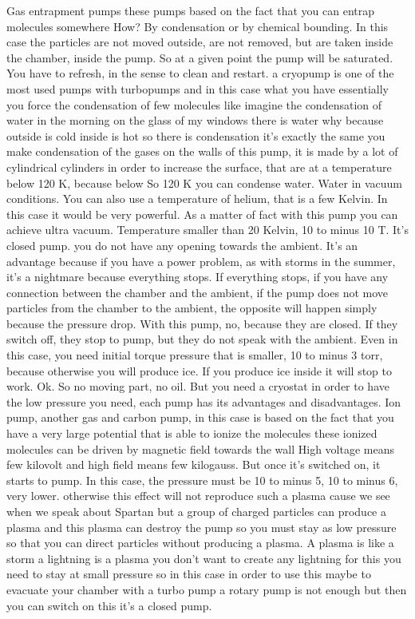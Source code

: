 Gas entrapment pumps these pumps based on the fact that you can entrap molecules somewhere How? By condensation or by chemical bounding. In this case the particles are not moved outside, are not removed, but are taken inside the chamber, inside the pump. So at a given point the pump will be saturated. You have to refresh, in the sense to clean and restart. a cryopump is one of the most used pumps with turbopumps and in this case what you have essentially you force the condensation of few molecules like imagine the condensation of water in the morning on the glass of my windows there is water why because outside is cold inside is hot so there is condensation it's exactly the same you make condensation of the gases on the walls of this pump, it is made by a lot of cylindrical cylinders in order to increase the surface, that are at a temperature below 120 K, because below So 120 K you can condense water. Water in vacuum conditions. You can also use a temperature of helium, that is a few Kelvin. In this case it would be very powerful. As a matter of fact with this pump you can achieve ultra vacuum. Temperature smaller than 20 Kelvin, 10 to minus 10 T. It's closed pump. you do not have any opening towards the ambient. It's an advantage because if you have a power problem, as with storms in the summer, it's a nightmare because everything stops. If everything stops, if you have any connection between the chamber and the ambient, if the pump does not move particles from the chamber to the ambient, the opposite will happen simply because the pressure drop. With this pump, no, because they are closed. If they switch off, they stop to pump, but they do not speak with the ambient. Even in this case, you need initial torque pressure that is smaller, 10 to minus 3 torr, because otherwise you will produce ice. If you produce ice inside it will stop to work. Ok. So no moving part, no oil. But you need a cryostat in order to have the low pressure you need, each pump has its advantages and disadvantages.
Ion pump, another gas and carbon pump, in this case is based on the fact that you have a very large potential that is able to ionize the molecules these ionized molecules can be driven by magnetic field towards the wall High voltage means few kilovolt and high field means few kilogauss. But once it's switched on, it starts to pump. In this case, the pressure must be 10 to minus 5, 10 to minus 6, very lower. otherwise this effect will not reproduce such a plasma cause we see when we speak about Spartan but a group of charged particles can produce a plasma and this plasma can destroy the pump so you must stay as low pressure so that you can direct particles without producing a plasma. A plasma is like a storm a lightning is a plasma you don't want to create any lightning for this you need to stay at small pressure so in this case in order to use this maybe to evacuate your chamber with a turbo pump a rotary pump is not enough but then you can switch on this it's a closed pump.
